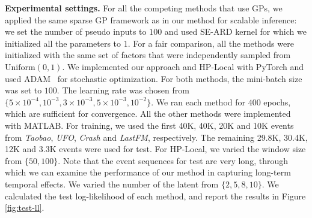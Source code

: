 \textbf{Experimental settings.}  For all the competing methods that use GPs, we applied the same sparse GP framework as in our method for scalable inference: we set the number of pseudo inputs to $100$ and used SE-ARD kernel for which we initialized all the parameters to $1$. For a fair comparison, all the methods were initialized with the same set of factors that were independently sampled from $\mathrm{Uniform}(0, 1)$. We implemented our approach and HP-Local with PyTorch and used ADAM~\citep{kingma2014adam} for stochastic optimization. For both methods, the mini-batch size was set to $100$. The learning rate was chosen from $\{5\times 10^{-4}, 10^{-3}, 3\times 10^{-3}, 5 \times 10^{-3}, 10^{-2}\}$. We ran each method for $400$ epochs, which are sufficient for convergence. All the other methods were implemented with MATLAB.  For training, we used the first 40K, 40K, 20K and 10K events from \textit{Taobao}, \textit{UFO}, \textit{Crash} and \textit{LastFM}, respectively. The remaining 29.8K, 30.4K, 12K and 3.3K events were used for test. %
For HP-Local, we varied the window size from $\{50, 100\}$. Note that the event sequences for test are very long, through which we can examine the performance of our method in capturing long-term temporal effects. We varied the number of the latent from $\{2, 5, 8, 10\}$. We calculated the test log-likelihood of each method, and report the results in Figure \ref{fig:test-ll}. 

